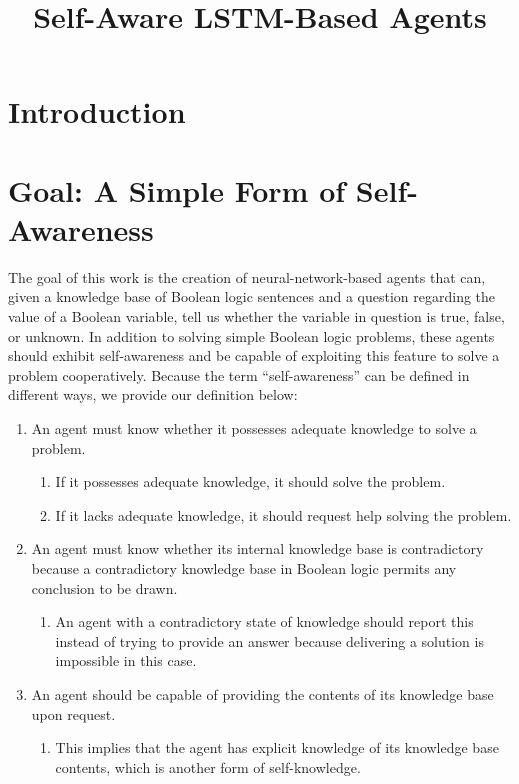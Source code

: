 \documentclass[
]{article}
\title{Self-Aware LSTM-Based Agents}
\author{}
\date{}
\begin{document}
\maketitle

\hypertarget{introduction}{%
\section{Introduction}\label{introduction}}

\hypertarget{goal-a-simple-form-of-self-awareness}{%
\section{Goal: A Simple Form of
Self-Awareness}\label{goal-a-simple-form-of-self-awareness}}

The goal of this work is the creation of neural-network-based agents
that can, given a knowledge base of Boolean logic sentences and a
question regarding the value of a Boolean variable, tell us whether the
variable in question is true, false, or unknown. In addition to solving
simple Boolean logic problems, these agents should exhibit
self-awareness and be capable of exploiting this feature to solve a
problem cooperatively. Because the term ``self-awareness'' can be
defined in different ways, we provide our definition below:

\begin{enumerate}
\def\labelenumi{\arabic{enumi}.}
\item
  An agent must know whether it possesses adequate knowledge to solve a
  problem.

  \begin{enumerate}
  \def\labelenumii{\alph{enumii}.}
  \item
    If it possesses adequate knowledge, it should solve the problem.
  \item
    If it lacks adequate knowledge, it should request help solving the
    problem.
  \end{enumerate}
\item
  An agent must know whether its internal knowledge base is
  contradictory because a contradictory knowledge base in Boolean logic
  permits any conclusion to be drawn.

  \begin{enumerate}
  \def\labelenumii{\alph{enumii}.}
  \item
    An agent with a contradictory state of knowledge should report this
    instead of trying to provide an answer because delivering a solution
    is impossible in this case.
  \end{enumerate}
\item
  An agent should be capable of providing the contents of its knowledge
  base upon request.

  \begin{enumerate}
  \def\labelenumii{\alph{enumii}.}
  \item
    This implies that the agent has explicit knowledge of its knowledge
    base contents, which is another form of self-knowledge.
  \end{enumerate}
\end{enumerate}
\end{document}
